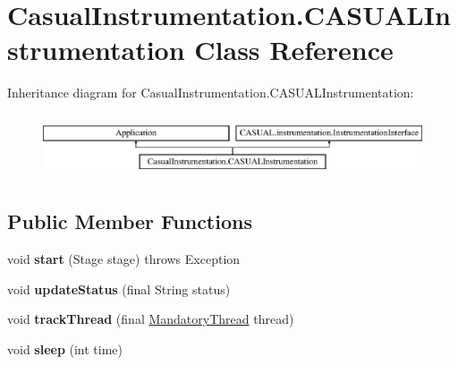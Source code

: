 \hypertarget{class_casual_instrumentation_1_1_c_a_s_u_a_l_instrumentation}{\section{Casual\-Instrumentation.\-C\-A\-S\-U\-A\-L\-Instrumentation Class Reference}
\label{class_casual_instrumentation_1_1_c_a_s_u_a_l_instrumentation}
}
Inheritance diagram for Casual\-Instrumentation.\-C\-A\-S\-U\-A\-L\-Instrumentation\-:\begin{figure}[H]
\begin{center}
\leavevmode
\includegraphics[height=1.891892cm]{class_casual_instrumentation_1_1_c_a_s_u_a_l_instrumentation}
\end{center}
\end{figure}
\subsection*{Public Member Functions}
\begin{DoxyCompactItemize}
\item 
\hypertarget{class_casual_instrumentation_1_1_c_a_s_u_a_l_instrumentation_a7dbefb9e0d94bf8c2e593365e825b2d5}{void {\bfseries start} (Stage stage)  throws Exception }\label{class_casual_instrumentation_1_1_c_a_s_u_a_l_instrumentation_a7dbefb9e0d94bf8c2e593365e825b2d5}

\item 
\hypertarget{class_casual_instrumentation_1_1_c_a_s_u_a_l_instrumentation_a71197b183e5802174901724d612de0af}{void {\bfseries update\-Status} (final String status)}\label{class_casual_instrumentation_1_1_c_a_s_u_a_l_instrumentation_a71197b183e5802174901724d612de0af}

\item 
\hypertarget{class_casual_instrumentation_1_1_c_a_s_u_a_l_instrumentation_a09d9d0a4f4d7713591a04f830b9b8e0e}{void {\bfseries track\-Thread} (final \hyperlink{class_c_a_s_u_a_l_1_1misc_1_1_mandatory_thread}{Mandatory\-Thread} thread)}\label{class_casual_instrumentation_1_1_c_a_s_u_a_l_instrumentation_a09d9d0a4f4d7713591a04f830b9b8e0e}

\item 
\hypertarget{class_casual_instrumentation_1_1_c_a_s_u_a_l_instrumentation_a11f8f6addf146b15be4bd7b36432f959}{void {\bfseries sleep} (int time)}\label{class_casual_instrumentation_1_1_c_a_s_u_a_l_instrumentation_a11f8f6addf146b15be4bd7b36432f959}

\end{DoxyCompactItemize}

